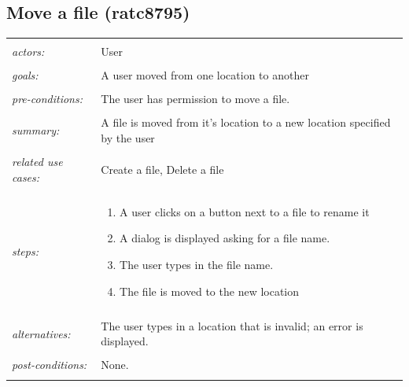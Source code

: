 \documentclass[11pt]{report}
\begin{document}
\subsection{Move a file (ratc8795)}
\begin{tabular}{ p{2cm} p{12cm} }
 \hline
 \\
 \textit{actors:} & User \\ 
 \\
 \textit{goals:} & A user moved from one location to another\\
 \\
 \textit{pre-conditions:} & The user has permission to move a file. \\
 \\
 \textit{summary:} & A file is moved from it's location to a new location specified by the user \\ 
 \\
 \textit{related use cases:} & Create a file, Delete a file \\ 
 \\
 \textit{steps:} & \begin{enumerate}
  \item A user clicks on a button next to a file to rename it
  \item A dialog is displayed asking for a file name.
  \item The user types in the file name.
  \item The file is moved to the new location
 \end{enumerate} \\
 \\
 \textit{alternatives:} & The user types in a location that is invalid; an error is displayed. \\
 \\
 \textit{post-conditions:} & None. \\
 \\
\hline
\end{tabular}
\end{document}
